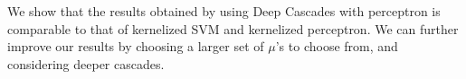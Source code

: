 \documentclass[paper=letter, fontsize=11pt]{scrartcl}
\numberwithin{equation}{section}		%
\numberwithin{figure}{section}			%
\numberwithin{table}{section}				%
\begin{document}
We show that the results obtained by using Deep Cascades with perceptron is comparable to that of kernelized SVM and kernelized perceptron. We can further improve our results by choosing a larger set of $\mu$'s to choose from, and considering deeper cascades.


\nocite{fml}
\nocite{code}
\printbibliography
\end{document}
